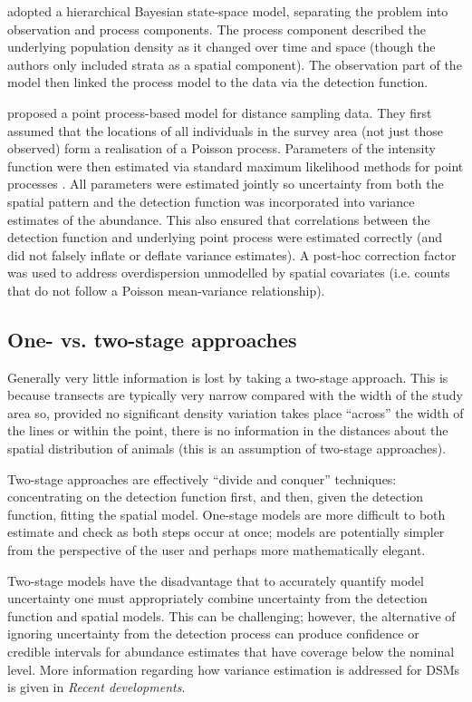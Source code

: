 \documentclass[a4paper,12pt]{article}
\begin{document}
\cite{Moore:2011jf} adopted a hierarchical Bayesian state-space model, separating the problem into observation and process components. The process component described the underlying population density as it changed over time and space (though the authors only included strata as a spatial component). The observation part of the model then linked the process model to the data via the detection function. 

\cite{Johnson:2010gf} proposed a point process-based model for distance sampling data. They first assumed that the locations of all individuals in the survey area (not just those observed) form a realisation of a Poisson process. Parameters of the intensity function were then estimated via standard maximum likelihood methods for point processes \citep{Baddeley:2000to}. All parameters were estimated jointly so uncertainty from both the spatial pattern and the detection function was incorporated into variance estimates of the abundance. This also ensured that correlations between the detection function and underlying point process were estimated correctly (and did not falsely inflate or deflate variance estimates). A post-hoc correction factor was used to address overdispersion unmodelled by spatial covariates (i.e. counts that do not follow a Poisson mean-variance relationship).

\subsection*{One- vs. two-stage approaches}

Generally very little information is lost by taking a two-stage approach. This is because transects are typically very narrow compared with the width of the study area so, provided no significant density variation takes place ``across'' the width of the lines or within the point, there is no information in the distances about the spatial distribution of animals (this is an assumption of two-stage approaches). 

Two-stage approaches are effectively ``divide and conquer'' techniques: concentrating on the detection function first, and then, given the detection function, fitting the spatial model. One-stage models are more difficult to both estimate and check as both steps occur at once; models are potentially simpler from the perspective of the user and perhaps more mathematically elegant.

 Two-stage models have the disadvantage that to accurately quantify model uncertainty one must appropriately combine uncertainty from the detection function and spatial models. This can be challenging; however, the alternative of ignoring uncertainty from the detection process \cite[e.g.][]{Niemi:2010kx} can produce confidence or credible intervals for abundance estimates that have coverage below the nominal level. More information regarding how variance estimation is addressed for DSMs is given in \textit{Recent developments}.
\end{document}
